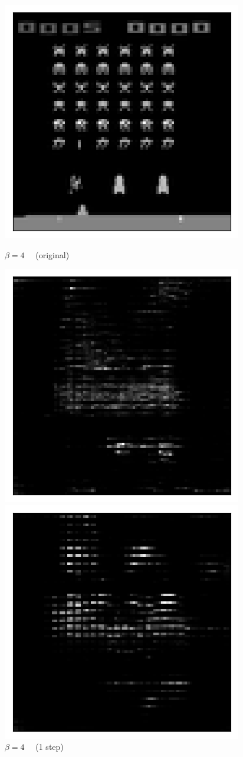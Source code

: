 \begin{figure}[h!]
\begin{multicols}{4}
    \includegraphics[scale=0.4]{figures/results/naive_average/beta_2_posterior_sample_original.png}
    \caption{$\beta=4\quad$ (original)}
    \includegraphics[scale=0.4]{figures/results/naive_average/beta_4_posterior_sample_0.png}
    \caption{$\beta=4\quad$ (1 step)}
    \includegraphics[scale=0.4]{figures/results/naive_average/beta_4_posterior_sample_5.png}

\end{multicols}
\end{figure}

